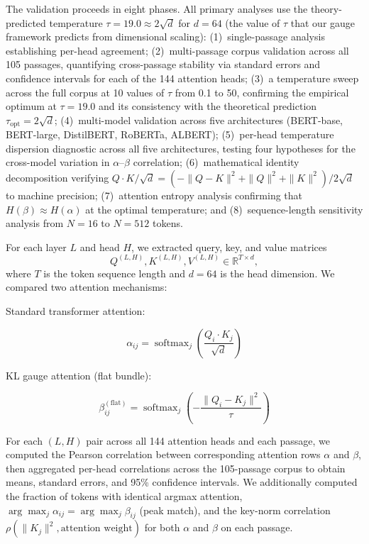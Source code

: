 \documentclass[twoside,11pt]{article}
\begin{document}
The validation proceeds in eight phases. All primary analyses use the theory-predicted temperature $\tau = 19.0 \approx 2\sqrt{d}$ for $d = 64$ (the value of $\tau$ that our gauge framework predicts from dimensional scaling): (1)~single-passage analysis establishing per-head agreement; (2)~multi-passage corpus validation across all 105 passages, quantifying cross-passage stability via standard errors and confidence intervals for each of the 144 attention heads; (3)~a temperature sweep across the full corpus at 10 values of $\tau$ from 0.1 to 50, confirming the empirical optimum at $\tau = 19.0$ and its consistency with the theoretical prediction $\tau_{\text{opt}} = 2\sqrt{d}$; (4)~multi-model validation across five architectures (BERT-base, BERT-large, DistilBERT, RoBERTa, ALBERT); (5)~per-head temperature dispersion diagnostic across all five architectures, testing four hypotheses for the cross-model variation in $\alpha$--$\beta$ correlation; (6)~mathematical identity decomposition verifying $Q \cdot K / \sqrt{d} = (-\|Q-K\|^2 + \|Q\|^2 + \|K\|^2)/2\sqrt{d}$ to machine precision; (7)~attention entropy analysis confirming that $H(\beta) \approx H(\alpha)$ at the optimal temperature; and (8)~sequence-length sensitivity analysis from $N = 16$ to $N = 512$ tokens.

For each layer $L$ and head $H$, we extracted query, key, and value matrices
\[
Q^{(L,H)}, K^{(L,H)}, V^{(L,H)} \in \mathbb{R}^{T \times d},
\]
where $T$ is the token sequence length and $d = 64$ is the head dimension. We compared two attention mechanisms:

Standard transformer attention:

\begin{equation}
\alpha_{ij} = \operatorname{softmax}_j \left( \frac{Q_i \cdot K_j}{\sqrt{d}} \right)
\end{equation}

KL gauge attention (flat bundle):

\begin{equation}
\beta^{(\mathrm{flat})}_{ij} = \operatorname{softmax}_j \left( -\frac{\|Q_i - K_j\|^2}{\tau} \right)
\end{equation}

For each $(L,H)$ pair across all 144 attention heads and each passage, we computed the Pearson correlation between corresponding attention rows $\alpha$ and $\beta$, then aggregated per-head correlations across the 105-passage corpus to obtain means, standard errors, and 95\% confidence intervals. We additionally computed the fraction of tokens with identical argmax attention, $\arg\max_j \alpha_{ij} = \arg\max_j \beta_{ij}$ (peak match), and the key-norm correlation $\rho(\|K_j\|^2, \text{attention weight})$ for both $\alpha$ and $\beta$ on each passage.
\end{document}
